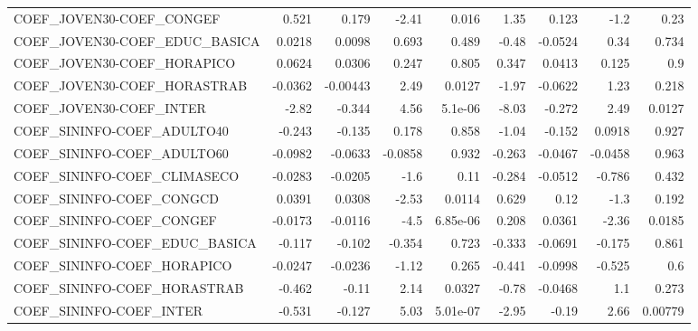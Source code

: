 \begin{tabular}{lrrrrrrrr}
COEF\_JOVEN30-COEF\_CONGEF              &       0.521 &        0.179 &   -2.41 &    0.016 &       1.35 &       0.123 &         -1.2 &          0.23 \\
COEF\_JOVEN30-COEF\_EDUC\_BASICA         &      0.0218 &       0.0098 &   0.693 &    0.489 &      -0.48 &     -0.0524 &         0.34 &         0.734 \\
COEF\_JOVEN30-COEF\_HORAPICO            &      0.0624 &       0.0306 &   0.247 &    0.805 &      0.347 &      0.0413 &        0.125 &           0.9 \\
COEF\_JOVEN30-COEF\_HORASTRAB           &     -0.0362 &     -0.00443 &    2.49 &   0.0127 &      -1.97 &     -0.0622 &         1.23 &         0.218 \\
COEF\_JOVEN30-COEF\_INTER               &       -2.82 &       -0.344 &    4.56 &  5.1e-06 &      -8.03 &      -0.272 &         2.49 &        0.0127 \\
COEF\_SININFO-COEF\_ADULTO40            &      -0.243 &       -0.135 &   0.178 &    0.858 &      -1.04 &      -0.152 &       0.0918 &         0.927 \\
COEF\_SININFO-COEF\_ADULTO60            &     -0.0982 &      -0.0633 & -0.0858 &    0.932 &     -0.263 &     -0.0467 &      -0.0458 &         0.963 \\
COEF\_SININFO-COEF\_CLIMASECO           &     -0.0283 &      -0.0205 &    -1.6 &     0.11 &     -0.284 &     -0.0512 &       -0.786 &         0.432 \\
COEF\_SININFO-COEF\_CONGCD              &      0.0391 &       0.0308 &   -2.53 &   0.0114 &      0.629 &        0.12 &         -1.3 &         0.192 \\
COEF\_SININFO-COEF\_CONGEF              &     -0.0173 &      -0.0116 &    -4.5 & 6.85e-06 &      0.208 &      0.0361 &        -2.36 &        0.0185 \\
COEF\_SININFO-COEF\_EDUC\_BASICA         &      -0.117 &       -0.102 &  -0.354 &    0.723 &     -0.333 &     -0.0691 &       -0.175 &         0.861 \\
COEF\_SININFO-COEF\_HORAPICO            &     -0.0247 &      -0.0236 &   -1.12 &    0.265 &     -0.441 &     -0.0998 &       -0.525 &           0.6 \\
COEF\_SININFO-COEF\_HORASTRAB           &      -0.462 &        -0.11 &    2.14 &   0.0327 &      -0.78 &     -0.0468 &          1.1 &         0.273 \\
COEF\_SININFO-COEF\_INTER               &      -0.531 &       -0.127 &    5.03 & 5.01e-07 &      -2.95 &       -0.19 &         2.66 &       0.00779 \\

\end{tabular}
